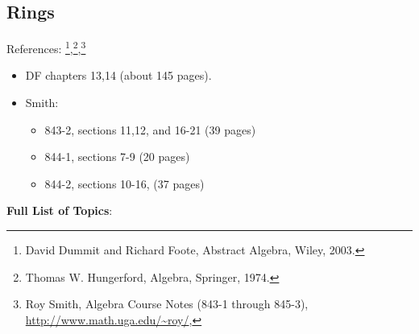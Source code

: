 \hypertarget{rings}{%
\subsection{Rings}\label{rings}}

References: \footnote{David Dummit and Richard Foote, Abstract Algebra,
  Wiley, 2003.},\footnote{Thomas W. Hungerford, Algebra, Springer, 1974.},\footnote{Roy
  Smith, Algebra Course Notes (843-1 through 845-3),
  \url{http://www.math.uga.edu/~roy/},}

\begin{itemize}
\item
  DF chapters 13,14 (about 145 pages).
\item
  Smith:

  \begin{itemize}
  \tightlist
  \item
    843-2, sections 11,12, and 16-21 (39 pages)
  \item
    844-1, sections 7-9 (20 pages)
  \item
    844-2, sections 10-16, (37 pages)
  \end{itemize}
\end{itemize}

\textbf{Full List of Topics}:

